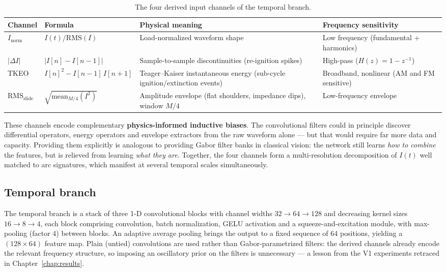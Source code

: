 \begin{table}[H]
\centering
\caption{The four derived input channels of the temporal branch.}
\label{tab:derived}
\renewcommand{\arraystretch}{1.5}
\small
\begin{tabular}{|P{1.9cm}|P{3.6cm}|p{4.1cm}|p{3.6cm}|}
\hline
\textbf{Channel} & \textbf{Formula} & \textbf{Physical meaning} & \textbf{Frequency sensitivity} \\
\hline
$I_{\text{norm}}$ & $I(t)/\mathrm{RMS}(I)$ & Load-normalized waveform shape & Low frequency (fundamental + harmonics) \\
\hline
$|\Delta I|$ & $|I[n]-I[n-1]|$ & Sample-to-sample discontinuities (re-ignition spikes) & High-pass ($H(z) = 1-z^{-1}$) \\
\hline
TKEO & $I[n]^2 - I[n{-}1]\,I[n{+}1]$ & Teager--Kaiser instantaneous energy \cite{kaiser1990tkeo} (sub-cycle ignition/extinction events) & Broadband, nonlinear (AM and FM sensitive) \\
\hline
$\mathrm{RMS}_{\text{slide}}$ & $\sqrt{\mathrm{mean}_{M/4}(I^2)}$ & Amplitude envelope (flat shoulders, impedance dips), window $M/4$ & Low-frequency envelope \\
\hline
\end{tabular}
\end{table}

These channels encode complementary \textbf{physics-informed inductive biases}. The convolutional filters could in principle discover differential operators, energy operators and envelope extractors from the raw waveform alone --- but that would require far more data and capacity. Providing them explicitly is analogous to providing Gabor filter banks in classical vision: the network still learns \emph{how to combine} the features, but is relieved from learning \emph{what they are}. Together, the four channels form a multi-resolution decomposition of $I(t)$ well matched to arc signatures, which manifest at several temporal scales simultaneously.

\subsection{Temporal branch}

The temporal branch is a stack of three 1-D convolutional blocks with channel widths $32 \to 64 \to 128$ and decreasing kernel sizes $16 \to 8 \to 4$, each block comprising convolution, batch normalization, GELU activation and a squeeze-and-excitation module, with max-pooling (factor 4) between blocks. An adaptive average pooling brings the output to a fixed sequence of 64 positions, yielding a $(128 \times 64)$ feature map. Plain (untied) convolutions are used rather than Gabor-parametrized filters: the derived channels already encode the relevant frequency structure, so imposing an oscillatory prior on the filters is unnecessary --- a lesson from the V1 experiments retraced in Chapter~\ref{chap:results}.

